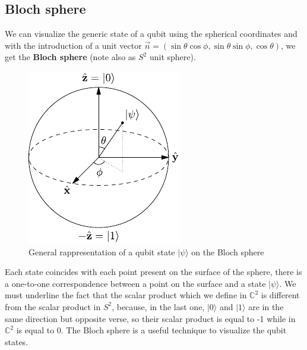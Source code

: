 \subsection{Bloch sphere}
We can visualize the generic state of a qubit using the spherical coordinates and with the introduction of a unit vector $\vec n = (\sin \theta \cos \phi, \sin \theta \sin \phi, \cos \theta)$, we get the \textbf{Bloch sphere} (note also as $S^2$ unit sphere).

\begin{figure}[!ht]
    \centering
    \includegraphics{images/chapter1/Bloch_Sphere.pdf}
    \caption{General rappresentation of a qubit state $|\psi\rangle$ on the Bloch sphere}
    \label{fig:BlochSphere}
\end{figure}

\noindent Each state coincides with each point present on the surface of the sphere, there is a one-to-one correspondence between a point on the surface and a state $|\psi\rangle$. We must underline the fact that the scalar product which we define in $\mathbb{C}^2$ is different from the scalar product in $S^2$, because, in the last one, $|0\rangle$ and $|1\rangle$ are in the same direction but opposite verse, so their scalar product is equal to -1 while in $\mathbb{C}^2$ is equal to 0. The Bloch sphere is a useful technique to visualize the qubit states.
\newpage
{}